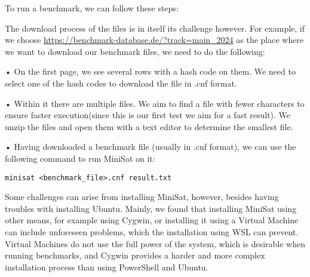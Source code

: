 \documentclass[runningheads]{llncs}
\begin{document}
To run a benchmark, we can follow these steps:

The download process of the files is in itself its challenge however. For example, if we choose \url{https://benchmark-database.de/?track=main_2024} as the place where  we want to download our benchmark files, we need to do the following:

• On the first page, we see several rows with a hash code on them. We need to select one of the hash codes to download the file in .cnf format.

• Within it there are multiple files. We aim to find a file with fewer characters to ensure faster execution(since this is our first test we aim for a fast result). We unzip the files and open them with a text editor to determine the smallest file.

• Having downloaded a benchmark file (usually in .cnf format), we can use the following command to run MiniSat on it: \begin{verbatim}
minisat <benchmark_file>.cnf result.txt
\end{verbatim}

Some challenges can arise from installing MiniSat, however, besides having troubles with installing Ubuntu. Mainly, we found that installing MiniSat using other means, for example using Cygwin, or installing it using a Virtual Machine can include unforeseen problems, which the installation using \ac{WSL} can prevent. Virtual Machines do not use the full power of the system, which is desirable when running benchmarks, and Cygwin provides a harder and more complex installation process than using PowerShell and Ubuntu.

\newpage

\begin{credits}
\subsubsection{\ackname} 

\subsubsection{\discintname}

\end{credits}
%
%
%
% 
% 
%
\newpage
\end{document}
